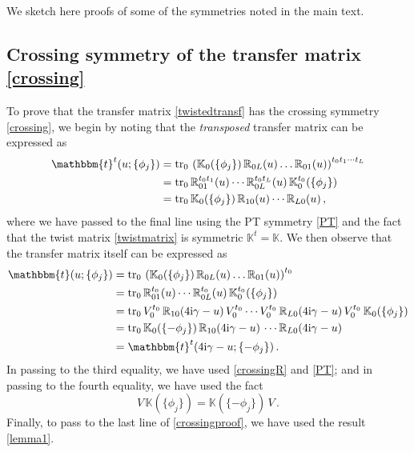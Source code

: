\documentclass[12pt]{article}
\numberwithin{equation}{section}
\newcommand{\ri}{{\rm i}}
\begin{document}
	We sketch here proofs of some of the symmetries noted in the main text.
	
	\subsection{Crossing symmetry of the transfer matrix \eqref{crossing}}
	
	To prove that the transfer matrix \eqref{twistedtransf} has
	the crossing symmetry \eqref{crossing}, we begin by noting that the \emph{transposed} transfer matrix can be expressed as
	\begin{align}
		\mathbbm{t}^t(u; \{\phi_j \}) & = \mathrm{tr}_{0}\, \left( \mathbb{K}_0(\{\phi_j \})\, \mathbb{R}_{0L}(u)\dots \mathbb{R}_{01}(u) \right)^{t_0 t_1 \cdots t_L} \nonumber \\
		& = \mathrm{tr}_{0}\, \mathbb{R}_{01}^{t_0 t_1}(u) \cdots \mathbb{R}_{0L}^{t_0 t_L}(u)\, \mathbb{K}^{t_0}_0(\{\phi_j \}) \nonumber \\
		& = \mathrm{tr}_{0}\, \mathbb{K}_0(\{\phi_j \})\, \mathbb{R}_{10}(u)  \cdots \mathbb{R}_{L0}(u) \,,
		\label{lemma1}
	\end{align}
	where we have passed to the final line using the PT symmetry \eqref{PT} and the fact that the twist matrix \eqref{twistmatrix} is symmetric $\mathbb{K}^t = \mathbb{K}$.
	We then observe that the transfer matrix itself can be expressed as 
	\begin{align}
		\mathbbm{t}(u; \{\phi_j \}) & = \mathrm{tr}_{0}\, \left( \mathbb{K}_0(\{\phi_j \})\, \mathbb{R}_{0L}(u)\dots \mathbb{R}_{01}(u) \right)^{t_0} \nonumber \\
		& = \mathrm{tr}_{0}\, \mathbb{R}_{01}^{t_0}(u) \cdots \mathbb{R}_{0L}^{t_0}(u)\, \mathbb{K}^{t_0}_0(\{\phi_j \}) \nonumber \\
		& = \mathrm{tr}_{0}\, V_0^{t_0}\, \mathbb{R}_{10}(4\ri \gamma-u)\, V_0^{t_0} \cdots V_0^{t_0}\, \mathbb{R}_{L0}(4\ri \gamma-u)\, V_0^{t_0}\, \mathbb{K}_0(\{\phi_j \}) \nonumber \\
		& = \mathrm{tr}_{0}\, \mathbb{K}_0(\{-\phi_j \})\, \mathbb{R}_{10}(4\ri \gamma-u)\,  \cdots  \mathbb{R}_{L0}(4\ri \gamma-u)\,  \nonumber \\
		& = \mathbbm{t}^t(4\ri \gamma-u; \{-\phi_j \})\,.
		\label{crossingproof}
	\end{align}
	In passing to the third equality, we have used \eqref{crossingR} and \eqref{PT}; and in passing to the fourth equality, we have used the fact
	\begin{equation}
		V\, \mathbb{K}(\{\phi_j \}) = \mathbb{K}(\{-\phi_j \})\, V \,.
		\label{VK}
	\end{equation}
	Finally, to pass to the last line of \eqref{crossingproof}, we have used the result \eqref{lemma1}. 
	
\end{document}
